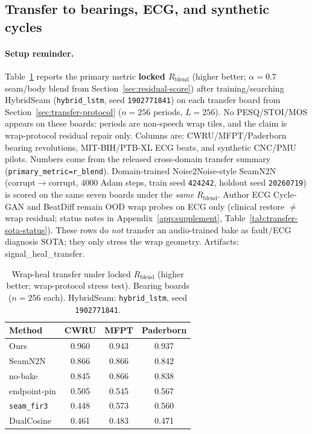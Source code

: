 \subsection{Transfer to bearings, ECG, and synthetic cycles}
\label{sec:transfer-main}

\paragraph{Setup reminder.}
Table~\ref{tab:transfer-main} reports the primary metric \textbf{locked $R_{\mathrm{blend}}$} (higher better; $\alpha{=}0.7$ seam/body blend from Section~\ref{sec:residual-score}) after training/searching HybridSeam
(\texttt{hybrid\_lstm}, seed \texttt{1902771841}) on each transfer board
from Section~\ref{sec:transfer-protocol} ($n{=}256$ periods, $L{=}256$).
No PESQ/STOI/MOS appears on these boards: periods are non-speech wrap tiles, and the claim is wrap-protocol residual repair only.
Columns are: CWRU/MFPT/Paderborn bearing revolutions, MIT-BIH/PTB-XL ECG beats, and synthetic CNC/PMU pilots.
Numbers come from the released
cross-domain transfer summary
(\texttt{primary\_metric=r\_blend}).
Domain-trained Noise2Noise-style SeamN2N (corrupt$\to$corrupt, $4000$ Adam steps, train seed \texttt{424242}, holdout seed \texttt{20260719})
is scored on the same seven boards under the \emph{same} $R_{\mathrm{blend}}$.
Author ECG Cycle-GAN and BeatDiff remain OOD wrap probes on ECG only
(clinical restore $\neq$ wrap residual; status notes in Appendix~\ref{app:supplement}, Table~\ref{tab:transfer-sota-status}).
These rows do \emph{not} transfer an audio-trained bake as fault/ECG diagnosis SOTA; they only stress the wrap geometry.
Artifacts:
signal\_heal\_transfer.

\begin{table}[t]
  \centering
  \caption{Wrap-heal transfer under locked $R_{\mathrm{blend}}$ (higher better; wrap-protocol stress test).
  Bearing boards ($n{=}256$ each). HybridSeam: \texttt{hybrid\_lstm}, seed \texttt{1902771841}.}
  \label{tab:transfer-main}
  \setlength{\tabcolsep}{3pt}
  \footnotesize
  \begin{tabular}{@{}lccc@{}}
    \toprule
    Method & CWRU & MFPT & Paderborn \\
    \midrule
    Ours & 0.960 & 0.943 & 0.937 \\
    SeamN2N & 0.866 & 0.866 & 0.842 \\
    no-bake & 0.845 & 0.866 & 0.838 \\
    endpoint-pin & 0.505 & 0.545 & 0.567 \\
    \texttt{seam\_fir3} & 0.448 & 0.573 & 0.560 \\
    DualCosine & 0.461 & 0.483 & 0.471 \\
    \bottomrule
  \end{tabular}
\end{table}

